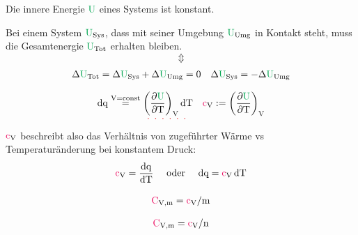 \begin{lawbox}\nospacing
  \begin{law}
    Die innere Energie $\Upot$ eines  Systems ist konstant.
  \end{law}
\end{lawbox}
\begin{lawbox}\nospacing
  \begin{law}
    Bei einem System $\Upot_{\text{Sys}}$, dass mit seiner Umgebung $\Upot_{\text{Umg}}$ in Kontakt steht, muss die
    Gesamtenergie $\Upot_{\text{Tot}}$ erhalten bleiben.
    \[\Updownarrow\]
    \begin{align}
      &\Delta\Upot_{\text{Tot}}=\Delta\Upot_{\text{Sys}}+\Delta\Upot_{\text{Umg}}=0
      &\Delta\Upot_{\text{Sys}}=-\Delta\Upot_{\text{Umg}}
    \end{align}
  \end{law}
\end{lawbox}
\begin{defnbox}\nospacing
  \begin{defn}[Wärmekapazität \tc{black}{$\Vz=$\normalfont{const}}]
    \begin{align}
      \diff\qp\stackrel{\Vz=\text{const}}{=}\uldotted{\left(\pfrac{\Upot}{\Tz}\right)_{\Vz}\diff\Tz}&&\cv:=\left(\pfrac{\Upot}{\Tz}\right)_{\Vz}\label{eq:WarmekapazitatVkonst}
    \end{align}
    $\cv$ beschreibt also das Verhältnis von zugeführter Wärme vs Temperaturänderung bei konstantem Druck:
    \begin{align}
      \cv=\frac{\diff\qp}{\diff\Tz}&&\text{ oder }&& \diff\qp=\cv\diff\Tz
    \end{align}
  \end{defn}
\end{defnbox}
\begin{notebox}\nospacing
        \begin{align}
          \cvm=\cv/\m
        \end{align}
\end{notebox}
\begin{notebox}\nospacing
        \begin{align}
          \cvm=\cv/\nz
        \end{align}
\end{notebox}
